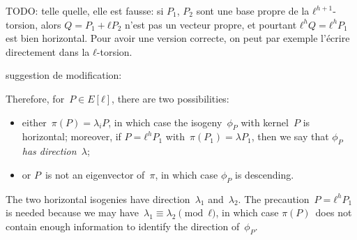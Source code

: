 \documentclass{lms}
\newcommand{\todo}[1]{{\color{red}TODO: #1}}
\begin{document}
\todo{telle quelle, elle est fausse: si $P_1$, $P_2$ sont une base
propre de la $ℓ^{h+1}$-torsion, alors $Q = P_1 + ℓ P_2$ n'est pas un
vecteur propre, et pourtant $ℓ^h Q = ℓ^h P_1$ est bien horizontal.
Pour avoir une version correcte, on peut par exemple l'écrire directement
dans la $ℓ$-torsion.

suggestion de modification:

Therefore, for~$P ∈ E[ℓ]$, there are two possibilities:
\begin{itemize}
\item either~$π(P) = λ_i P$, in which case
the isogeny~$ϕ_P$ with kernel~$P$ is horizontal;
moreover, if $P = ℓ^{h} P_1$ with~$π(P_1) = λ P_1$,
then we say that \emph{$ϕ_P$ has direction~$λ$};
\item or $P$~is not an eigenvector of~$π$,
in which case $ϕ_P$ is descending.
\end{itemize}
The two horizontal isogenies have direction~$λ_1$ and~$λ_2$.
The precaution~$P = ℓ^h P_1$ is needed because
we may have~$λ_1 ≡ λ_2 \pmod{ℓ}$, in which case $π(P)$~does not contain
enough information to identify the direction of~$ϕ_P$.
}
\end{document}
